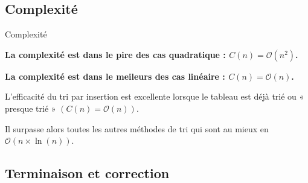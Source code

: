 \subsection{Complexité}

\begin{prop}{Complexité}
%
%
%


\textbf{La complexité est dans le pire des cas quadratique : $C(n)=\mathcal{O}(n^2)$.}

\textbf{La complexité est dans le meileurs des cas linéaire : $C(n)=\mathcal{O}(n)$.}
 

L'efficacité du tri par insertion est excellente lorsque le tableau est déjà trié ou « presque trié » $(C(n)=\mathcal{O}(n))$. 

Il surpasse alors toutes les autres méthodes de tri qui sont au mieux en $\mathcal{O}(n \times \ln(n))$.
\end{prop}

\subsection{Terminaison et correction}


